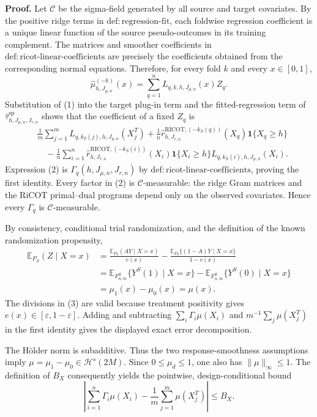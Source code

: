 \textbf{Proof.}
Let \(\mathcal C\) be the sigma-field generated by all source and target covariates. By the positive ridge terms in \(\mathrm{def:regression\text{-}fit}\), each foldwise regression coefficient is a unique linear function of the source pseudo-outcomes in its training complement. The matrices and smoother coefficients in \(\mathrm{def:ricot\text{-}linear\text{-}coefficients}\) are precisely the coefficients obtained from the corresponding normal equations. Therefore, for every fold \(k\) and every \(x\in[0,1]\),
\[
\widehat\mu^{(-k)}_{h,J_{\mu,n}}(x)
=\sum_{q=1}^n L_{q,k,h,J_{\mu,n}}(x)Z_q.
\tag{1}
\]
Substitution of (1) into the target plug-in term and the fitted-regression term of \(\widehat\tau^{\mathrm{sp}}_{h,J_{\mu,n},J_{r,n}}\) shows that the coefficient of a fixed \(Z_q\) is
\[
\begin{aligned}
{}&\frac1m\sum_{j=1}^mL_{q,k_T(j),h,J_{\mu,n}}(X_j^T)
+\frac1n\widehat r^{\mathrm{RICOT},(-k_S(q))}_{h,J_{r,n}}(X_q)\mathbf 1\{X_q\ge h\}\\
&\quad-\frac1n\sum_{i=1}^n
\widehat r^{\mathrm{RICOT},(-k_S(i))}_{h,J_{r,n}}(X_i)\mathbf 1\{X_i\ge h\}
L_{q,k_S(i),h,J_{\mu,n}}(X_i).
\end{aligned}
\tag{2}
\]
Expression (2) is \(\Gamma_q(h,J_{\mu,n},J_{r,n})\) by \(\mathrm{def:ricot\text{-}linear\text{-}coefficients}\), proving the first identity. Every factor in (2) is \(\mathcal C\)-measurable: the ridge Gram matrices and the RiCOT primal--dual programs depend only on the observed covariates. Hence every \(\Gamma_q\) is \(\mathcal C\)-measurable.

By consistency, conditional trial randomization, and the definition of the known randomization propensity,
\[
\begin{aligned}
\mathbb E_{P_S}(Z\mid X=x)
&=\frac{\mathbb E_{P_S}(AY\mid X=x)}{e(x)}
-\frac{\mathbb E_{P_S}\{(1-A)Y\mid X=x\}}{1-e(x)}\\
&=\mathbb E_{F^S_{n,m}}\{Y^S(1)\mid X=x\}
-\mathbb E_{F^S_{n,m}}\{Y^S(0)\mid X=x\}\\
&=\mu_1(x)-\mu_0(x)=\mu(x).
\end{aligned}
\tag{3}
\]
The divisions in (3) are valid because treatment positivity gives \(e(x)\in[\varepsilon,1-\varepsilon]\). Adding and subtracting \(\sum_i\Gamma_i\mu(X_i)\) and \(m^{-1}\sum_j\mu(X_j^T)\) in the first identity gives the displayed exact error decomposition.

The Hölder norm is subadditive. Thus the two response-smoothness assumptions imply \(\mu=\mu_1-\mu_0\in\mathcal H^s(2M)\). Since \(0\le\mu_d\le1\), one also has \(\|\mu\|_\infty\le1\). The definition of \(B_X\) consequently yields the pointwise, design-conditional bound
\[
\left|\sum_{i=1}^n\Gamma_i\mu(X_i)-\frac1m\sum_{j=1}^m\mu(X_j^T)\right|\le B_X.
\tag{4}
\]

